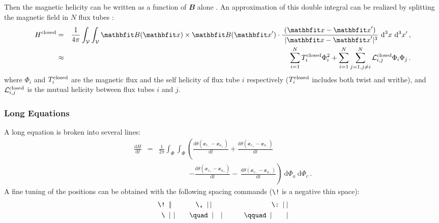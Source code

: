 \documentclass[namedreferences,hyperref,optionalrh]{spr-sola}
\renewcommand{\vec}[1]{{\mathbfit #1}}
\newcommand{\deriv}[2]{\frac{{\mathrm d} #1}{{\mathrm d} #2}}
\newcommand{\rmd}{{\ \mathrm d}}
\newcommand{\vol}{{\mathcal V}}
\newcommand{\dv}{~{\mathrm d}^3 x}
\newcommand{\intv}{\int_{\vol}^{}}
\newcommand{\bb}{\vec B}
\newcommand{\xx}{\vec x}
\begin{document}
Then the magnetic helicity can be written as a function of $\bb$
alone \citep{Moffatt69}. An approximation of this double integral 
can be realized by splitting
the magnetic field in $N$ flux tubes \citep{BergerF84}:
\begin{eqnarray}   
H^{\rm closed} &=& \frac{1}{4\pi} \intv \intv
                  \bb (\xx ) \times \bb (\xx ^\prime )
                  \cdot \frac{(\xx  - \xx ^\prime)}{\,\, |\xx - \xx ^\prime |^3}
                  \dv \dv ^\prime \,,                     \label{Eq-H-B} \\      
              &\approx & \sum_{i=1}^N T_i^{\rm closed} \Phi_i^2
                       + \sum_{i=1}^N \sum_{j=1,j \neq i}^N
                         {\mathcal L}^{\rm closed}_{i,j} \Phi_i \Phi_j  \,.
                   \label{Eq-H-N}     %
\end{eqnarray}
where $\Phi_i$ and $T_i^{\rm closed}$ are the magnetic flux and the
self helicity of flux tube $i$ respectively ($T_i^{\rm closed}$
includes both twist and writhe), and ${\mathcal L}^{\rm
closed}_{i,j}$ is the mutual helicity between flux tubes $i$ and
$j$.

\subsubsection{Long Equations} %
\label{S-long-equations}
A long equation is broken into several lines:
\begin{eqnarray}
\deriv{H}{t} &=& 
              \frac{1}{2 \pi} \int_{\Phi } \int_{\Phi }
              \left(   \deriv{ \theta (\xx _{c_-} -\xx _{a_+}) }{t}
                     + \deriv{ \theta (\xx _{c_+} -\xx _{a_-}) }{t}
              \right.                            \nonumber  \\
 && \qquad \qquad \;
              \left. - \deriv{ \theta (\xx _{c_+} -\xx _{a_+}) }{t}
                   -\, \deriv{ \theta (\xx _{c_-} -\xx _{a_-}) }{t}
              \right) 
              \rmd \Phi_{a} \rmd \Phi_{c}  \,. \label{Eq-dH-Phi}
\end{eqnarray}
A fine tuning of the positions can be obtained with the following spacing commands
(\verb+\!+ is a negative thin space):
\begin{eqnarray} 
\verb+\! + |\!| \,\  \qquad &    \! \verb+  \, + |\,|    
                    & \qquad    \verb+    \: + |\:|       \nonumber \\
\verb+\ + |\ |       \qquad &    \verb+\quad + |\quad| 
                    & \qquad    \verb+\qquad + |\qquad|   \nonumber  
\end{eqnarray}
\end{document}
